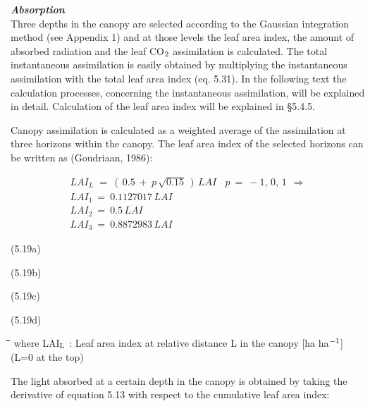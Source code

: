  {\it {\bf Absorption}\/}\\
Three depths in the canopy are selected according to the Gaussian integration method (see
Appendix 1) and at those levels the leaf area index, the amount of absorbed radiation and
the leaf CO$_{{\rm 2}}$ assimilation is calculated. The total instantaneous assimilation is easily
obtained by multiplying the instantaneous assimilation with the total leaf area index (eq.
5.31). In the following text the calculation processes, concerning the instantaneous
assimila\-tion, will be explained in detail. Calculation of the leaf area index will be
explained in \S 5.4.5.


Canopy assimilation is calculated as a weighted average of the assimilation at three
horizons within the canopy. The leaf area index of the selected horizons can be written as
(Goudriaan, 1986):

\begin{eqnarray*}
 LAI _{L~~} =~(\, 0.5~+~p\, \sqrt{0.15} \, )\, LAI~~~~p~=~-1,\, 0,\, 1~~ \Rightarrow   \nonumber  \\
LAI _{1} ~=~0.1127017\, LAI \nonumber  \\
LAI _{2} ~=~0.5\, LAI \nonumber  \\
LAI _{3} ~=~0.8872983\, LAI
\end{eqnarray*}

 
\strut\hfill (5.19a)\\
\strut\hfill (5.19b)\\
\strut\hfill (5.19c)\\
\strut\hfill (5.19d)

\nwln
\begin{tabbing}
\hspace{1.27cm}\=\hspace{1.27cm}\=\hspace{1.27cm}\=\hspace{1.27cm}\=%
\hspace{1.27cm}\=\hspace{1.27cm}\=\hspace{1.27cm}\=\hspace{1.27cm}\=%
\hspace{1.27cm}\=\hspace{1.27cm}\=\kill
where LAI$_{{\rm L}}$ : Leaf area index at relative distance L in the canopy         [ha ha$^{{\rm -1}}$]\\
   (L=0 at the top)
\end{tabbing}



The light absorbed at a certain depth in the canopy is obtained by taking the derivative of
equation 5.13 with respect to the cumulative leaf area index:

